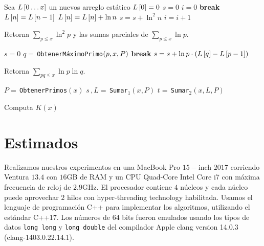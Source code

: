 \begin{algorithm}[H]
    \SetAlgoLined
    \DontPrintSemicolon
     {
        Sea \(L\left[ 0 \dots x \right]\) un nuevos arreglo est\'atico\;
        \(L\left[ 0 \right] = 0\)\;
        \(s = 0\)\;
        \(i = 0\)\;
         {
             {
                \textbf{break}\;
            }
            \(L\left[ n \right] = L\left[ n - 1 \right]\)\;
             {
                \(L\left[ n \right] = L\left[ n \right] + \ln n\)\;
                \(s = s + \ln^2 n\)\;
                \(i = i + 1\)\;
            }
        }
    }
    \caption{Retorna \(\sum_{p \leq x} \ln^2 p\) y las sumas parciales de \(\sum_{p \leq x} \ln p\).}
\end{algorithm}

\begin{algorithm}[H]
    \SetAlgoLined
    \DontPrintSemicolon
     {
        \(s = 0\)\;
         {
            \(q =\,\)\texttt{ObtenerM\'aximoPrimo}\(\left( p, x, P \right)\)\;
             {
                \textbf{break}\;
            }
            \(s = s + \ln p \cdot \left( L\left[ q \right] - L\left[ p - 1 \right] \right)\)\;
        }
    }
    \caption{Retorna \(\sum_{pq \leq x} \ln p \ln q\).}
\end{algorithm}

\begin{algorithm}[H]
    \SetAlgoLined
    \DontPrintSemicolon
     {
        \(P = \,\)\texttt{ObtenerPrimos}\((x)\)\;
        \(s \, , L = \,\)\texttt{Sumar}\(_1(x, P)\)\;
        \(t = \,\)\texttt{Sumar}\(_2(x, L, P)\)\;
    }
    \caption{Computa \(K(x)\)}
\end{algorithm}

\section{Estimados}

Realizamos nuestros experimentos en una
MacBook Pro \(15-\)inch \(2017\)
corriendo Ventura \(13.4\)
con \(16\)GB de RAM y
un CPU Quad-Core Intel Core i7
con m\'axima frecuencia de reloj de \(2.9\)GHz.
El procesador contiene \(4\) n\'ucleos
y cada n\'ucleo puede aprovechar \(2\) hilos
con hyper-threading technology habilitada.
Usamos el lenguaje de programaci\'on C++ para implementar los algoritmos,
utilizando el est\'andar C++17.
Los n\'umeros de \(64\) bits fueron emulados usando los tipos de datos
\texttt{long long} y \texttt{long double} del compilador
Apple clang version 14.0.3 (clang-1403.0.22.14.1).

